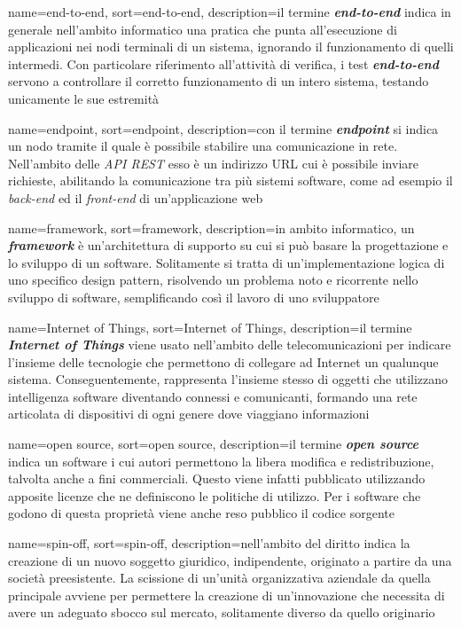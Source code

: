 {
    name=end-to-end,
    sort=end-to-end,
    description={il termine \textit{\textbf{end-to-end}} indica in generale nell’ambito informatico una pratica che punta all’esecuzione di applicazioni nei nodi terminali di un sistema, ignorando il funzionamento di quelli intermedi. Con particolare riferimento all’attività di verifica, i test \textit{\textbf{end-to-end}} servono a controllare il corretto funzionamento di un intero sistema, testando unicamente le sue estremità}
}

{
    name=endpoint,
    sort=endpoint,
    description={con il termine \textbf{\textit{endpoint}} si indica un nodo tramite il quale è possibile stabilire una comunicazione in rete. Nell’ambito delle \textit{API REST} esso è un indirizzo URL cui è possibile inviare richieste, abilitando la comunicazione tra più sistemi software, come ad esempio il \textit{back-end} ed il \textit{front-end} di un’applicazione web}
}

{
    name=framework,
    sort=framework,
    description={in ambito informatico, un \textit{\textbf{framework}} è un’architettura di supporto su cui si può basare la progettazione e lo sviluppo di un software. Solitamente si tratta di un’implementazione logica di uno specifico design pattern, risolvendo un problema noto e ricorrente nello sviluppo di software, semplificando così il lavoro di uno sviluppatore}
}

{
    name=Internet of Things,
    sort=Internet of Things,
    description={il termine \textit{\textbf{Internet of Things}} viene usato nell’ambito delle telecomunicazioni per indicare l’insieme delle tecnologie che permettono di collegare ad Internet un qualunque sistema. Conseguentemente, rappresenta l’insieme stesso di oggetti che utilizzano intelligenza software diventando connessi e comunicanti, formando una rete articolata di dispositivi di ogni genere dove viaggiano informazioni}
}

{
    name=open source,
    sort=open source,
    description={il termine \textit{\textbf{open source}} indica un software i cui autori permettono la libera modifica e redistribuzione, talvolta anche a fini commerciali. Questo viene infatti pubblicato utilizzando apposite licenze che ne definiscono le politiche di utilizzo. Per i software che godono di questa proprietà viene anche reso pubblico il codice sorgente}
}

{
    name=spin-off,
    sort=spin-off,
    description={nell’ambito del diritto indica la creazione di un nuovo soggetto giuridico, indipendente, originato a partire da una società preesistente. La scissione di un’unità organizzativa aziendale da quella principale avviene per permettere la creazione di un’innovazione che necessita di avere un adeguato sbocco sul mercato, solitamente diverso da quello originario}
}

